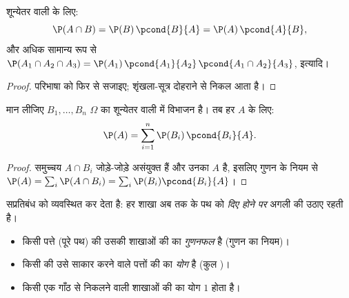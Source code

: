 \begin{proposition}[गुणन का नियम]\label{prop:g12:condprob:product}
शून्येतर  वाली  के लिए:
\[
\P(A \cap B) = \P(B)\,\pcond{B}{A} = \P(A)\,\pcond{A}{B},
\]
और अधिक सामान्य रूप से $\P(A_1 \cap A_2 \cap A_3) = \P(A_1)\,\pcond{A_1}{A_2}\,
\pcond{A_1 \cap A_2}{A_3}$, इत्यादि।
\end{proposition}

\begin{proof}
परिभाषा को फिर से सजाइए; शृंखला-सूत्र दोहराने से निकल आता है।
\end{proof}

\begin{theorem}[कुल प्रायिकता का नियम]\label{thm:g12:condprob:total}
मान लीजिए $B_1, \dots, B_n$ $\Omega$ का शून्येतर  वाली  में विभाजन है। तब हर
 $A$ के लिए:
\[
\P(A) = \sum_{i=1}^{n} \P(B_i)\,\pcond{B_i}{A}.
\]
\end{theorem}

\begin{proof}
समुच्चय $A \cap B_i$ जोड़े-जोड़े असंयुक्त हैं और उनका  $A$ है, इसलिए गुणन के
नियम से $\P(A) = \sum_i \P(A \cap B_i) = \sum_i \P(B_i)\pcond{B_i}{A}$।
\end{proof}

\begin{method}[प्रायिकता वृक्ष]\label{met:g12:condprob:tree}
 सप्रतिबंध  को व्यवस्थित कर देता है: हर शाखा अब तक के पथ
को \emph{दिए होने पर} अगली  की  उठाए रहती है।
\begin{itemize}
  \item किसी पत्ते (पूरे पथ) की  उसकी शाखाओं की  का
        \emph{गुणनफल} है (गुणन का नियम)।
  \item किसी  की  उसे साकार करने वाले पत्तों की  का
        \emph{योग} है (कुल )।
  \item किसी एक गाँठ से निकलने वाली शाखाओं की  का योग $1$ होता
        है।
\end{itemize}
\end{method}

